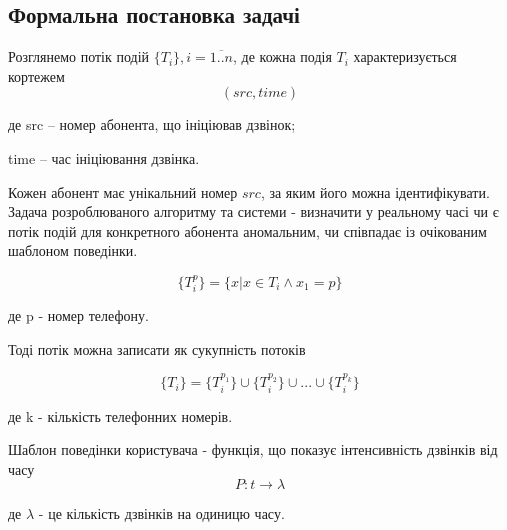 \subsection{Формальна постановка задачі}


	Розглянемо потік подій $\{T_i\}, i = \overline{1..n}$, де кожна подія $T_i$ характеризується кортежем
  \begin{equation}\label{eq:tuple} (src, time) \end{equation}
  \begin{ESKDexplanation}
    \item де src -- номер абонента, що ініціював дзвінок;
    \item time -- час ініціювання дзвінка.
  \end{ESKDexplanation}

  Кожен абонент має унікальний номер $src$, за яким його можна ідентифікувати. Задача розроблюваного алгоритму та системи - визначити у реальному часі чи є потік подій для конкретного абонента аномальним, чи співпадає із очікованим шаблоном поведінки.

  \begin{equation}\label{eq:stream}\{T_i^{p}\} = \{x | x \in T_i \wedge x_1 = p\}\end{equation}
  \begin{ESKDexplanation}
    \item де p - номер телефону.
  \end{ESKDexplanation}

  Тоді потік можна записати як сукупність потоків 

  \begin{equation}\label{eq:stream_sum}\{T_i\} = \{T_i^{p_1}\} \cup \{T_i^{p_2}\} \cup ... \cup \{T_i^{p_k}\} \end{equation}
  \begin{ESKDexplanation}
    \item де k - кількість телефонних номерів.
  \end{ESKDexplanation}

  Шаблон поведінки користувача - функція, що показує інтенсивність дзвінків від часу
  \begin{equation}\label{eq:pattern}P: t \rightarrow \lambda \end{equation}

  \begin{ESKDexplanation}
    \item де $\lambda$ - це кількість дзвінків на одиницю часу.
  \end{ESKDexplanation}

